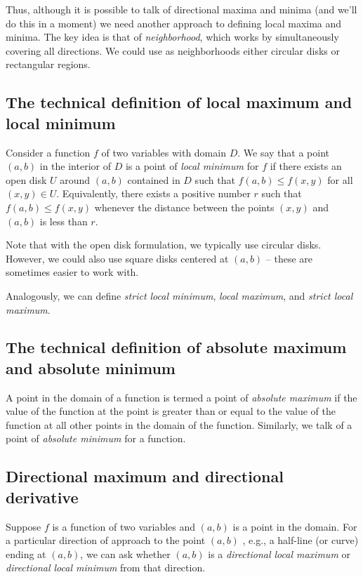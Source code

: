 \documentclass[10pt]{amsart}
\begin{document}
Thus, although it is possible to talk of directional maxima and minima
(and we'll do this in a moment) we need another approach to defining
local maxima and minima. The key idea is that of {\em neighborhood},
which works by simultaneously covering all directions. We could use as
neighborhoods either circular disks or rectangular regions.

\subsection{The technical definition of local maximum and local minimum}

Consider a function $f$ of two variables with domain $D$. We say that
a point $(a,b)$ in the interior of $D$ is a point of {\em local
minimum} for $f$ if there exists an open disk $U$ around $(a,b)$
contained in $D$ such that $f(a,b) \le f(x,y)$ for all $(x,y) \in
U$. Equivalently, there exists a positive number $r$ such that $f(a,b)
\le f(x,y)$ whenever the distance between the points $(x,y)$ and
$(a,b)$ is less than $r$.

Note that with the open disk formulation, we typically use circular
disks. However, we could also use square disks centered at $(a,b)$ --
these are sometimes easier to work with.

Analogously, we can define {\em strict local minimum}, {\em local
maximum}, and {\em strict local maximum}.

\subsection{The technical definition of absolute maximum and absolute minimum}

A point in the domain of a function is termed a point of {\em absolute
maximum} if the value of the function at the point is greater than or
equal to the value of the function at all other points in the domain
of the function. Similarly, we talk of a point of {\em absolute
minimum} for a function.

\subsection{Directional maximum and directional derivative}

Suppose $f$ is a function of two variables and $(a,b)$ is a point in
the domain. For a particular direction of approach to the point
$(a,b)$ , e.g., a half-line (or curve) ending at $(a,b)$, we can ask
whether $(a,b)$ is a {\em directional local maximum} or {\em
directional local minimum} from that direction.
\end{document}
